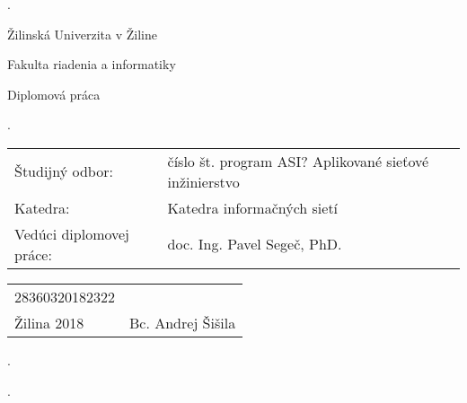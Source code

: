 \begin{titlepage}

\phantom.

\bigskip

\begin{center}
{\sc\LARGE Žilinská Univerzita v Žiline}

\medskip

{\sc\Large Fakulta riadenia a informatiky}

\vspace{4cm}

{\sc\LARGE Diplomová práca}

\medskip

{\large\bf \nazovpraceSK}

\end{center}

\phantom.\hfill
\begin{center}


\begin{tabu} to 1.0 \textwidth { X[4,l] X[8,r] }
 Študijný odbor: & číslo št. program ASI? Aplikované sieťové inžinierstvo \\ 
 Katedra: & Katedra informačných sietí \\
 Vedúci diplomovej práce: & doc. Ing. Pavel Segeč, PhD. \\
\end{tabu}

\vspace*{\fill}

\begin{tabu} to 1.0 \textwidth { X[l] X[r] }
 28360320182322 &  \\
 Žilina 2018  & Bc. Andrej Šišila  \\
\end{tabu}

\end{center}
\hspace{1.7cm}\phantom.

\vspace{2.9cm}

\phantom.
\end{titlepage}
